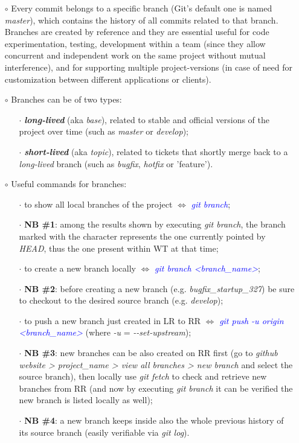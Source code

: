 \documentclass[a4paper,portrait,10pt]{article}   %
\newcommand{\mydiv}{$\Leftrightarrow$ }   %
\newcommand{\mysapo}[1]{\textquotesingle #1\textquotesingle }   %
\newcommand{\mycmd}[1]{\textcolor{blue}{\textit{#1}}}   %
\newcommand{\myvspace}{\vspace{4mm}}   %
\begin{document}
\begin{itemize}
\item[$\circ$] Every commit belongs to a specific branch (Git's default one is named \textit{master}), which contains the history of all commits related to that branch. Branches are created by reference and they are essential useful for code experimentation, testing, development within a team (since they allow concurrent and independent work on the same project without mutual interference), and for supporting multiple project-versions (in case of need for customization between different applications or clients).
\myvspace

\item[$\circ$] Branches can be of two types:
\begin{itemize}
  \item[$\cdot$] \textbf{\textit{long-lived}} (aka \textit{base}), related to stable and official versions of the project over time (such as \textit{master} or \textit{develop});
  \item[$\cdot$] \textbf{\textit{short-lived}} (aka \textit{topic}), related to tickets that shortly merge back to a \textit{long-lived} branch (such as \textit{bugfix}, \textit{hotfix} or 'feature').
\end{itemize}
\myvspace

\item[$\circ$] Useful commands for branches:
\begin{itemize}
  \item[$\cdot$] to show all local branches of the project \mydiv \mycmd{git branch};
  \item[$\cdot$] \textbf{NB \#1}: among the results shown by executing \textit{git branch}, the branch marked with the \mysapo{*} character represents the one currently pointed by \textit{HEAD}, thus the one present within WT at that time;
  \item[$\cdot$] to create a new branch locally \mydiv \mycmd{git branch <branch\_name>};
  \item[$\cdot$] \textbf{NB \#2}: before creating a new branch (e.g. \textit{bugfix\_startup\_327}) be sure to checkout to the desired source branch (e.g. \textit{develop});
  \item[$\cdot$] to push a new branch just created in LR to RR \mydiv \mycmd{git push -u origin <branch\_name>} (where \textit{-u} = \textit{-{}-set-upstream});
  \item[$\cdot$] \textbf{NB \#3}: new branches can be also created on RR first (go to \textit{github website > project\_name > view all branches > new branch} and select the source branch), then locally use \textit{git fetch} to check and retrieve new branches from RR (and now by executing \textit{git branch} it can be verified the new branch is listed locally as well);
  \item[$\cdot$] \textbf{NB \#4}: a new branch keeps inside also the whole previous history of its source branch (easily verifiable via \textit{git log}).
\end{itemize}
\myvspace


\end{itemize}
\end{document}
